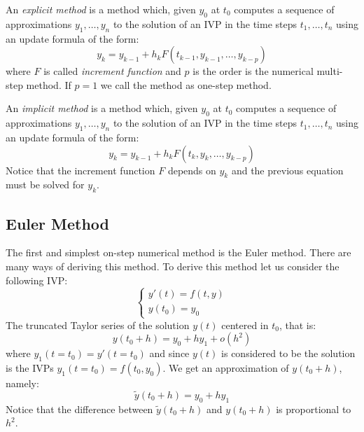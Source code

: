 \begin{definition}
	An \textit{explicit method} is a method which, given $y_0$ at $t_0$ computes a sequence of approximations $y_1, \dots, y_n$ to the solution of an IVP in the time steps $t_1, \dots, t_n$ using an update formula of the form:
	\begin{equation}
		y_k = y_{k-1} + h_kF(t_{k-1},y_{k-1},\dots,y_{k-p})
	\end{equation}
	where $F$ is called \textit{increment function} and $p$ is the order is the numerical multi-step method. If $p=1$ we call the method as one-step method. 
\end{definition}

\begin{definition}
	An \textit{implicit method} is a method which, given $y_0$ at $t_0$ computes a sequence of approximations $y_1, \dots, y_n$ to the solution of an IVP in the time steps $t_1, \dots, t_n$ using an update formula of the form:
	\begin{equation}
		y_k = y_{k-1} + h_kF(t_{k},y_{k},\dots,y_{k-p})
	\end{equation}
	Notice that the increment function $F$ depends on $y_k$ and the previous equation must be solved for $y_k$.
\end{definition}

\subsection{Euler Method}
The first and simplest on-step numerical method is the Euler method. There are many ways of deriving this method. To derive this method let us consider the following IVP:
\begin{equation}
	\begin{cases}
		y'(t) = f(t,y) \\
		y(t_0)=y_0
	\end{cases}
\end{equation}
The truncated Taylor series of the solution $y(t)$ centered in $t_0$, that is:
\begin{equation}
	y(t_0+h) = y_0 + hy_1 + o(h^2)
	\label{eq::taylor_euler}
\end{equation}
where $y_1(t=t_0)=y'(t=t_0)$ and since $y(t)$ is considered to be the solution is the IVPs $y_1(t=t_0)=f(t_0,y_0)$. We get an approximation of $y(t_0+h)$, namely:
\begin{equation}
	\tilde{y}(t_0+h) = y_0 + hy_1
	\label{eq::euler_0}
\end{equation}
Notice that the difference between $\tilde{y}(t_0+h)$ and $y(t_0+h)$ is proportional to $h^2$.

